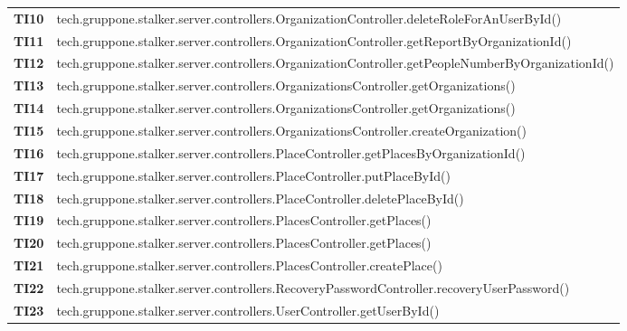 \documentclass[../../piano-di-qualifica.tex]{subfiles}
\begin{document}
\begin{longtable}[H]{>{\centering\bfseries}m{3cm} >{}m{13cm}}
  TI10               & tech.gruppone.stalker.server.controllers.OrganizationController.deleteRoleForAnUserById\@() \\

  TI11               & tech.gruppone.stalker.server.controllers.OrganizationController.getReportByOrganizationId\@() \\

  TI12               & tech.gruppone.stalker.server.controllers.OrganizationController.getPeopleNumberByOrganizationId\@() \\

  TI13               & tech.gruppone.stalker.server.controllers.OrganizationsController.getOrganizations\@() \\

  TI14               & tech.gruppone.stalker.server.controllers.OrganizationsController.getOrganizations\@() \\

  TI15               & tech.gruppone.stalker.server.controllers.OrganizationsController.createOrganization\@() \\

  TI16               & tech.gruppone.stalker.server.controllers.PlaceController.getPlacesByOrganizationId\@() \\

  TI17               & tech.gruppone.stalker.server.controllers.PlaceController.putPlaceById\@() \\

  TI18               & tech.gruppone.stalker.server.controllers.PlaceController.deletePlaceById\@() \\

  TI19               & tech.gruppone.stalker.server.controllers.PlacesController.getPlaces\@() \\

  TI20               & tech.gruppone.stalker.server.controllers.PlacesController.getPlaces\@() \\

  TI21               & tech.gruppone.stalker.server.controllers.PlacesController.createPlace\@() \\

  TI22               & tech.gruppone.stalker.server.controllers.RecoveryPasswordController.recoveryUserPassword\@() \\

  TI23               & tech.gruppone.stalker.server.controllers.UserController.getUserById\@() \\


\end{longtable}
\end{document}
